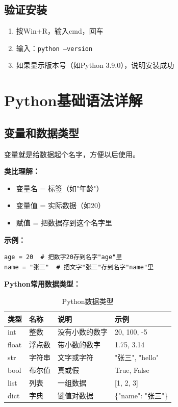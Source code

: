 \documentclass[12pt,a4paper]{article}
\begin{document}
\subsection{验证安装}

\begin{enumerate}
    \item 按Win+R，输入cmd，回车
    \item 输入：\texttt{python --version}
    \item 如果显示版本号（如Python 3.9.0），说明安装成功
\end{enumerate}

\section{Python基础语法详解}

\subsection{变量和数据类型}

\begin{knowledgebox}[什么是变量？]
变量就是给数据起个名字，方便以后使用。

\textbf{类比理解：}
\begin{itemize}
    \item 变量名 = 标签（如"年龄"）
    \item 变量值 = 实际数据（如20）
    \item 赋值 = 把数据存到这个名字里
\end{itemize}

\textbf{示例：}
\begin{lstlisting}
age = 20  # 把数字20存到名字"age"里
name = "张三"  # 把文字"张三"存到名字"name"里
\end{lstlisting}
\end{knowledgebox}

\textbf{Python常用数据类型：}

\begin{table}[H]
\centering
\caption{Python数据类型}
\begin{tabular}{|l|l|l|l|}
\hline
\textbf{类型} & \textbf{名称} & \textbf{说明} & \textbf{示例} \\
\hline
int & 整数 & 没有小数的数字 & 20, 100, -5 \\
\hline
float & 浮点数 & 带小数的数字 & 1.75, 3.14 \\
\hline
str & 字符串 & 文字或字符 & "张三", "hello" \\
\hline
bool & 布尔值 & 真或假 & True, False \\
\hline
list & 列表 & 一组数据 & [1, 2, 3] \\
\hline
dict & 字典 & 键值对数据 & \{"name": "张三"\} \\
\hline
\end{tabular}
\end{table}
\end{document}
